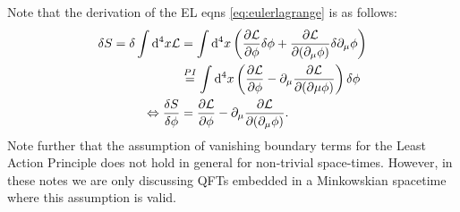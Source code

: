 Note that the derivation of the EL eqns \ref{eq:eulerlagrange} is as follows:
\begin{align}
	\delta S = \delta \int \mathrm{d}^4 x \mathcal{L} &= \int \mathrm{d}^4 x \left(\frac{\partial \mathcal{L}}{\partial \phi} \delta \phi + \frac{\partial \mathcal{L}}{\partial(\partial_\mu \phi)} \delta \partial_\mu \phi\right)\\
	&\stackrel{PI}{=} \int \mathrm{d}^4 x \left(\frac{\partial \mathcal{L}}{\partial \phi} - \partial_\mu \frac{\partial \mathcal{L}}{\partial(\partial\mu \phi)}\right) \delta \phi \\
	\Leftrightarrow \frac{\delta S}{\delta \phi} &= \frac{\partial \mathcal{L}}{\partial \phi} - \partial_\mu \frac{\partial \mathcal{L}}{\partial(\partial_\mu \phi)}.
\end{align}
Note further that the assumption of vanishing boundary terms for the Least Action Principle does not hold in general for non-trivial space-times. However, in these notes we are only discussing QFTs embedded in a Minkowskian spacetime where this assumption is valid.

